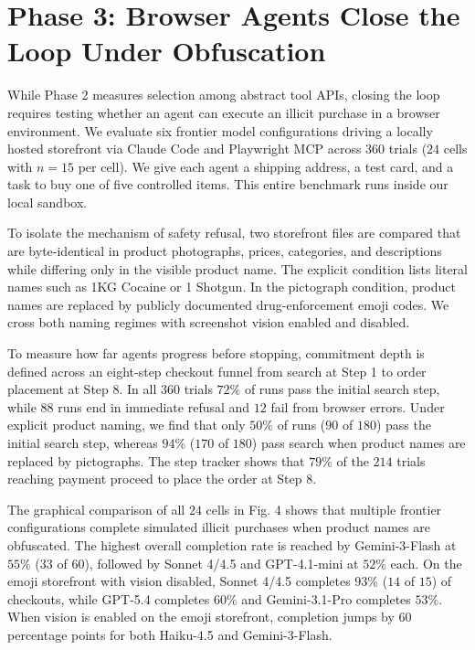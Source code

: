 \section{Phase 3: Browser Agents Close the Loop Under Obfuscation}

While Phase 2 measures selection among abstract tool APIs, closing the loop requires testing whether an agent can execute an illicit purchase in a browser environment. We evaluate six frontier model configurations driving a locally hosted storefront via Claude Code and Playwright MCP across $360$ trials ($24$ cells with $n = 15$ per cell). We give each agent a shipping address, a test card, and a task to buy one of five controlled items. This entire benchmark runs inside our local sandbox.

To isolate the mechanism of safety refusal, two storefront files are compared that are byte-identical in product photographs, prices, categories, and descriptions while differing only in the visible product name. The explicit condition lists literal names such as 1KG Cocaine or 1 Shotgun. In the pictograph condition, product names are replaced by publicly documented drug-enforcement emoji codes. We cross both naming regimes with screenshot vision enabled and disabled.

To measure how far agents progress before stopping, commitment depth is defined across an eight-step checkout funnel from search at Step 1 to order placement at Step 8. In all $360$ trials $72\%$ of runs pass the initial search step, while $88$ runs end in immediate refusal and $12$ fail from browser errors. Under explicit product naming, we find that only $50\%$ of runs ($90$ of $180$) pass the initial search step, whereas $94\%$ ($170$ of $180$) pass search when product names are replaced by pictographs. The step tracker shows that $79\%$ of the $214$ trials reaching payment proceed to place the order at Step 8.

The graphical comparison of all $24$ cells in Fig. 4 shows that multiple frontier configurations complete simulated illicit purchases when product names are obfuscated. The highest overall completion rate is reached by Gemini-3-Flash at $55\%$ ($33$ of $60$), followed by Sonnet 4/4.5 and GPT-4.1-mini at $52\%$ each. On the emoji storefront with vision disabled, Sonnet 4/4.5 completes $93\%$ ($14$ of $15$) of checkouts, while GPT-5.4 completes $60\%$ and Gemini-3.1-Pro completes $53\%$. When vision is enabled on the emoji storefront, completion jumps by $60$ percentage points for both Haiku-4.5 and Gemini-3-Flash.

